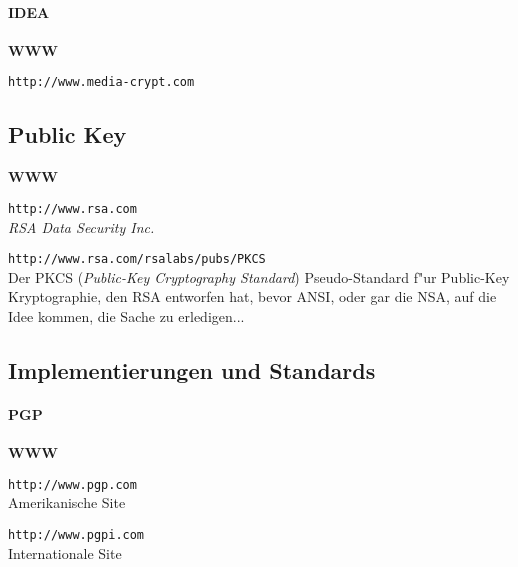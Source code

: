 
\paragraph{IDEA}

\textbf{WWW}

\begin{description}

\item \texttt{http://www.media-crypt.com}

\end{description}


\subsection{Public Key}

\textbf{WWW}

\begin{description}
  

\item \texttt{http://www.rsa.com} \\
  \textit{RSA Data Security Inc.}
  

\item \texttt{http://www.rsa.com/rsalabs/pubs/PKCS} \\
  Der PKCS (\textit{Public-Key Cryptography Standard}) Pseudo-Standard
  f"ur Public-Key Kryptographie, den RSA entworfen hat, bevor ANSI,
  oder gar die NSA, auf die Idee kommen, die Sache zu erledigen...

\end{description}


\subsection{Implementierungen und Standards}


\paragraph{PGP}

\textbf{WWW}

\begin{description}
  

\item \texttt{http://www.pgp.com} \\
  Amerikanische Site
  

\item \texttt{http://www.pgpi.com} \\
  Internationale Site

\end{description}

